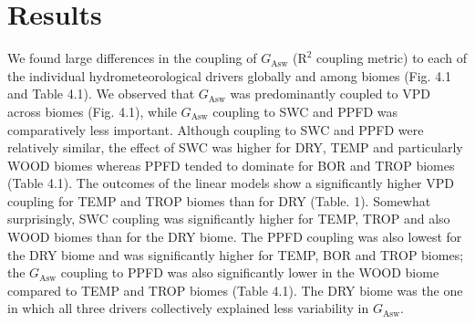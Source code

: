 \documentclass[11pt,twoside]{reedthesis}
\begin{document}
\section{Results}\label{results}

We found large differences in the coupling of \(G_{\text{Asw}}\)
(\(\text{R}^2\) coupling metric) to each of the individual
hydrometeorological drivers globally and among biomes (Fig. 4.1 and
Table 4.1). We observed that \(G_{\text{Asw}}\) was predominantly
coupled to VPD across biomes (Fig. 4.1), while \(G_{\text{Asw}}\)
coupling to SWC and PPFD was comparatively less important. Although
coupling to SWC and PPFD were relatively similar, the effect of SWC was
higher for DRY, TEMP and particularly WOOD biomes whereas PPFD tended to
dominate for BOR and TROP biomes (Table 4.1). The outcomes of the linear
models show a significantly higher VPD coupling for TEMP and TROP biomes
than for DRY (Table. 1). Somewhat surprisingly, SWC coupling was
significantly higher for TEMP, TROP and also WOOD biomes than for the
DRY biome. The PPFD coupling was also lowest for the DRY biome and was
significantly higher for TEMP, BOR and TROP biomes; the
\(G_{\text{Asw}}\) coupling to PPFD was also significantly lower in the
WOOD biome compared to TEMP and TROP biomes (Table 4.1). The DRY biome
was the one in which all three drivers collectively explained less
variability in \(G_{\text{Asw}}\).\par
\end{document}
